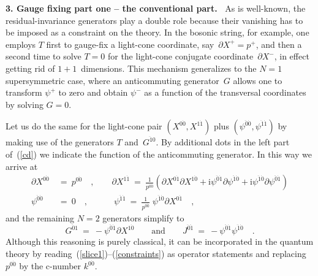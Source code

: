 \documentclass[a4paper,11pt]{article}
\def\j{\psi}
\def\i{\textrm{i}}
\def\N2{$N{=}2$}
\def\pa{\mbox{$\partial$}}
\def\sfrac#1#2{{\textstyle\frac{#1}{#2}}}
\def\zd{{\dot{0}}}
\def\od{{\dot{1}}}
\def\zdd{{\ddot{0}}}
\def\odd{{\ddot{1}}}
\def\pinv{\sfrac{1}{p^{0\zd}}}
\begin{document}
\bigskip
\noindent
{\bf 3. Gauge fixing part one -- the conventional part.\ }
As is well-known, the residual-invariance generators play a double role
because their vanishing has to be imposed as a constraint on the theory.
In the bosonic string, for example, one employs $T$ first to gauge-fix
a light-cone coordinate, say~$\pa X^+=p^+$, and then a second time to
solve $T{=}0$ for the light-cone conjugate coordinate~$\pa X^-$, in effect
getting rid of $1{+}1$~dimensions.
This mechanism generalizes to the $N{=}1$ supersymmetric case,
where an anticommuting generator~$G$ allows one to transform $\j^+$ to zero
and obtain $\j^-$ as a function of the transversal coordinates by solving
$G{=}0$.

Let us do the same for the light-cone pair
$(X^{0\zd},X^{1\od})$ plus $(\j^{\zdd\zd},\j^{\odd\od})$
by making use of the generators $T$ and~$G^{\odd 0}$.
By additional dots in the left part of~(\ref{cd}) we indicate
the function of the anticommuting generator.
In this way we arrive at
\begin{align} \label{slice1}
\pa X^{0\zd}\ &=\ p^{0\zd} \quad,\qquad
\pa X^{1\od}\  =\ \pinv (\pa X^{0\od} \pa X^{1\zd}
	+ \i\j^{\zdd\od} \pa\j^{\odd\zd} + \i\j^{\odd\zd} \pa\j^{\zdd\od}) \\
\label{slice2}
\j^{\zdd\zd}\ &=\ 0 \quad,\qquad\quad
\j^{\odd\od}\  =\ \pinv\;\j^{\odd\zd} \pa X^{0\od} \quad,
\end{align}
and the remaining \N2 generators simplify to
\begin{equation} \label{constraints}
G^{\zdd 1}\ =\ -\j^{\zdd\od} \pa X^{1\zd} 
\qquad\textrm{and}\qquad
J^{\zdd\odd}\ =\ -\j^{\zdd\od} \j^{\odd\zd} \quad.
\end{equation}
Although this reasoning is purely classical, it can be incorporated in the
quantum theory by reading~(\ref{slice1})--(\ref{constraints}) as operator
statements and replacing $p^{0\zd}$ by the c-number $k^{0\zd}$.
\\
\end{document}
